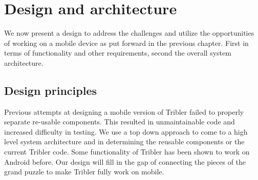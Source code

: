 \chapter{Design and architecture}
\label{ch:design}

We now present a design to address the challenges and utilize the opportunities of working on a mobile device as put forward in the previous chapter.
First in terms of functionality and other requirements, second the overall system architecture.


\section{Design principles}
Previous attempts at designing a mobile version of Tribler failed to properly separate re-usable components.
This resulted in unmaintainable code and increased difficulty in testing.
We use a top down approach to come to a high level system architecture and in determining the reusable components or the current Tribler code.
Some functionality of Tribler has been shown to work on Android before.
Our design will fill in the gap of connecting the pieces of the grand puzzle to make Tribler fully work on mobile.

